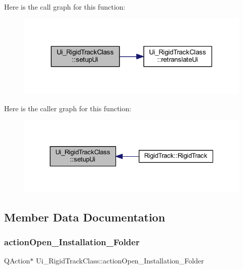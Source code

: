 Here is the call graph for this function\+:\nopagebreak
\begin{figure}[H]
\begin{center}
\leavevmode
\includegraphics[width=318pt]{class_ui___rigid_track_class_a7f78fefc15716049b873bef4d3450e38_cgraph}
\end{center}
\end{figure}
Here is the caller graph for this function\+:\nopagebreak
\begin{figure}[H]
\begin{center}
\leavevmode
\includegraphics[width=331pt]{class_ui___rigid_track_class_a7f78fefc15716049b873bef4d3450e38_icgraph}
\end{center}
\end{figure}


\subsection{Member Data Documentation}
\mbox{\label{class_ui___rigid_track_class_adbf50ad17608dbfe8a688dc8f18d1ec3}} 
\subsubsection{action\+Open\+\_\+\+Installation\+\_\+\+Folder}
{\footnotesize\ttfamily Q\+Action$\ast$ Ui\+\_\+\+Rigid\+Track\+Class\+::action\+Open\+\_\+\+Installation\+\_\+\+Folder}

